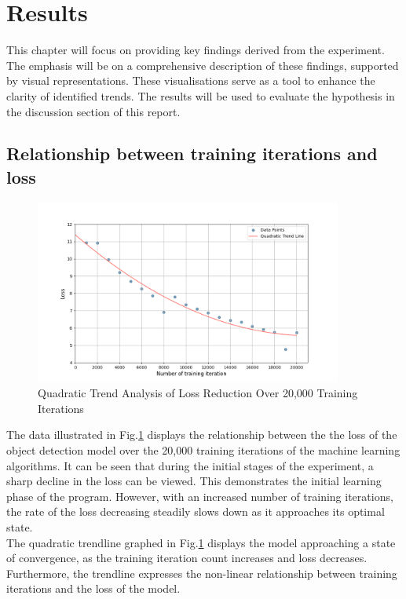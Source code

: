 \section{Results}
This chapter will focus on providing key findings derived from the experiment.
The emphasis will be on a comprehensive description of these findings, supported by visual representations. These visualisations serve
as a tool to enhance the clarity of identified trends. The results will be used to evaluate the hypothesis in the discussion section of this report.

\subsection{Relationship between training iterations and loss}
\begin{figure}[h]
   \centering
   \includegraphics[width=0.9\textwidth]{../Data/loss_by_iteration_plot.png}
   \caption{Quadratic Trend Analysis of Loss Reduction Over 20,000 Training Iterations}
   \label{fig:loss-vs-training-iterations}
\end{figure}
The data illustrated in Fig.\ref{fig:loss-vs-training-iterations} displays the relationship between the the loss of the object detection model over the 20,000 training iterations of the machine learning algorithms. It can be seen that during the initial stages of the experiment, a sharp decline in the loss can be viewed. This demonstrates the initial learning phase of the program. However, with an increased number of training iterations, the rate of the loss decreasing steadily slows down as it approaches its optimal state. \\

The quadratic trendline graphed in Fig.\ref{fig:loss-vs-training-iterations}  displays the model approaching a state of convergence, as the training iteration count increases and loss decreases. Furthermore, the trendline expresses the non-linear relationship between training iterations and the loss of the model. \\
\newpage

